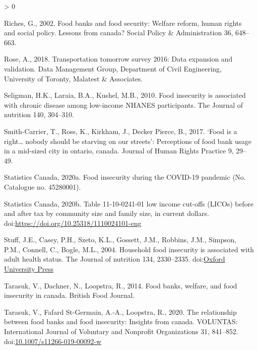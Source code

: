 \documentclass[]{elsarticle} %
\newlength{\cslhangindent}
\newenvironment{CSLReferences}[2] %
 {%
  \setlength{\parindent}{0pt}
  \ifodd #1 \everypar{\setlength{\hangindent}{\cslhangindent}}\ignorespaces\fi
  \ifnum #2 > 0
  \setlength{\parskip}{#2\baselineskip}
  \fi
 }%
 {}
\begin{document}
\begin{CSLReferences}{1}{0}
\leavevmode\hypertarget{ref-riches2002food}{}%
Riches, G., 2002. Food banks and food security: Welfare reform, human
rights and social policy. Lessons from canada? Social Policy \&
Administration 36, 648--663.

\leavevmode\hypertarget{ref-rose2018transportation}{}%
Rose, A., 2018. Transportation tomorrow survey 2016: Data expansion and
validation. Data Management Group, Department of Civil Engineering,
University of Toronty, Malatest \& Associates.

\leavevmode\hypertarget{ref-seligman2010food}{}%
Seligman, H.K., Laraia, B.A., Kushel, M.B., 2010. Food insecurity is
associated with chronic disease among low-income NHANES participants.
The Journal of nutrition 140, 304--310.

\leavevmode\hypertarget{ref-smith2017food}{}%
Smith-Carrier, T., Ross, K., Kirkham, J., Decker Pierce, B., 2017.
{`Food is a right\ldots{} nobody should be starving on our streets'}:
Perceptions of food bank usage in a mid-sized city in ontario, canada.
Journal of Human Rights Practice 9, 29--49.

\leavevmode\hypertarget{ref-statisticscanada2020food}{}%
Statistics Canada, 2020a. Food insecurity during the COVID-19 pandemic
(No. Catalogue no. 45280001).

\leavevmode\hypertarget{ref-statisticscanada2020licos}{}%
Statistics Canada, 2020b. Table 11-10-0241-01 low income cut-offs
(LICOs) before and after tax by community size and family size, in
current dollars. doi:\url{https://doi.org/10.25318/1110024101-eng}

\leavevmode\hypertarget{ref-stuff2004household}{}%
Stuff, J.E., Casey, P.H., Szeto, K.L., Gossett, J.M., Robbins, J.M.,
Simpson, P.M., Connell, C., Bogle, M.L., 2004. Household food insecurity
is associated with adult health status. The Journal of nutrition 134,
2330--2335.
doi:\href{https://doi.org/Oxford\%20University\%20Press}{Oxford University Press}

\leavevmode\hypertarget{ref-tarasuk2014food}{}%
Tarasuk, V., Dachner, N., Loopstra, R., 2014. Food banks, welfare, and
food insecurity in canada. British Food Journal.

\leavevmode\hypertarget{ref-tarasuk2020relationship}{}%
Tarasuk, V., Fafard St-Germain, A.-A., Loopstra, R., 2020. The
relationship between food banks and food insecurity: Insights from
canada. VOLUNTAS: International Journal of Voluntary and Nonprofit
Organizations 31, 841--852.
doi:\href{https://doi.org/10.1007/s11266-019-00092-w}{10.1007/s11266-019-00092-w}


\end{CSLReferences}
\end{document}
